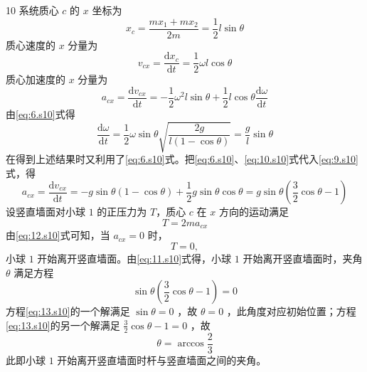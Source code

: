 \begin{solution}{10}
系统质心 $c$ 的 $x$ 坐标为
\begin{equation}
x _ {c} = \frac {m x _ {1} + m x _ {2}}{2 m} = \frac {1}{2} l \sin \theta 
\label{eq:7.s10}
\end{equation}
质心速度的 $x$ 分量为
\begin{equation}
v _ {c x} = \frac {\mathrm{d} x _ {c}}{\mathrm{d} t} = \frac {1}{2} \omega l \cos \theta 
\label{eq:8.s10}
\end{equation}
质心加速度的 $x$ 分量为
\begin{equation}
a _ {c x} = \frac {\mathrm{d} v _ {c x}}{\mathrm{d} t} = - \frac {1}{2} \omega^ {2} l \sin \theta + \frac {1}{2} l \cos \theta \frac {\mathrm{d} \omega}{\mathrm{d} t}
\label{eq:9.s10}
\end{equation}
由\eqref{eq:6.s10}式得
\begin{equation}
\frac {\mathrm{d} \omega}{\mathrm{d} t} = \frac {1}{2} \omega \sin \theta \sqrt {\frac {2 g}{l (1 - \cos \theta)}} = \frac {g}{l} \sin \theta 
\label{eq:10.s10}
\end{equation}
在得到上述结果时又利用了\eqref{eq:6.s10}式。把\eqref{eq:6.s10}、\eqref{eq:10.s10}式代入\eqref{eq:9.s10}式，得
\begin{equation}
a _ {c x} = \frac {\mathrm{d} v _ {c x}}{\mathrm{d} t} = - g \sin \theta (1 - \cos \theta) + \frac {1}{2} g \sin \theta \cos \theta = g \sin \theta \left(\frac {3}{2} \cos \theta - 1\right)
\label{eq:11.s10}
\end{equation}
设竖直墙面对小球 $1$ 的正压力为 $T$，质心 $c$ 在 $x$ 方向的运动满足
\begin{equation}
T = 2 m a _ {c x}
\label{eq:12.s10}
\end{equation}
由\eqref{eq:12.s10}式可知，当 $a_{cx}=0$ 时，
\begin{equation}
T = 0,
\label{eq:13.s10}
\end{equation}
小球 $1$ 开始离开竖直墙面。由\eqref{eq:11.s10}式得，小球 $1$ 开始离开竖直墙面时，夹角 $\theta$ 满足方程
\begin{equation}
\sin \theta \left(\frac {3}{2} \cos \theta - 1\right) = 0
\label{eq:14.s10}
\end{equation}
方程\eqref{eq:13.s10}的一个解满足 $\sin\theta=0$ ，故 $\theta=0$ ，此角度对应初始位置；方程\eqref{eq:13.s10}的另一个解满足 $\frac{3}{2}\cos\theta-1=0$ ，故
\begin{equation}
\theta = \arccos \frac {2}{3}
\label{eq:15.s10}
\end{equation}
此即小球 $1$ 开始离开竖直墙面时杆与竖直墙面之间的夹角。
\end{solution}